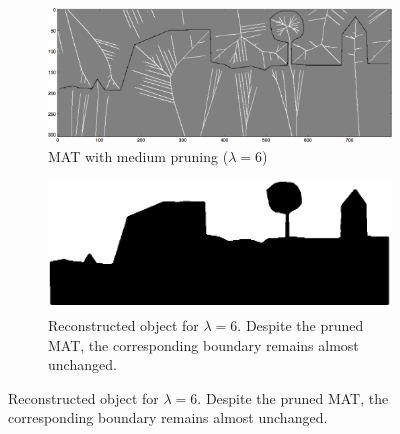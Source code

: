 \begin{figure}
	\begin{subfigure}{0.4\linewidth}
		\includegraphics[width=\linewidth]{figs/rasterimpl/simple_dtm-gamma6_earthskel_.png}
		\caption{MAT with medium pruning ($\lambda=6$)}
		\label{fig:imaimp:c}
	\end{subfigure}
	\quad
	\begin{subfigure}{0.4\linewidth}
		\includegraphics[width=\linewidth]{figs/rasterimpl/simple_dtm-gamma6_earthskel.png}
		\caption{Reconstructed object for $\lambda=6$. Despite the pruned MAT, the corresponding boundary remains almost unchanged.}
		\label{fig:imaimp:d}
	\end{subfigure}
	

\end{figure}

